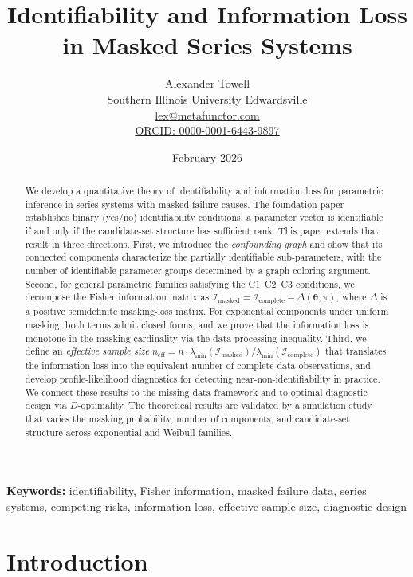 \documentclass[11pt]{article}
\title{Identifiability and Information Loss in Masked Series Systems}
\author{
    Alexander Towell\\
    Southern Illinois University Edwardsville\\
    \href{mailto:lex@metafunctor.com}{lex@metafunctor.com}\\
    \href{https://orcid.org/0000-0001-6443-9897}{ORCID: 0000-0001-6443-9897}
}
\date{February 2026}
\theoremstyle{definition}
\theoremstyle{plain}
\renewcommand{\v}[1]{\boldsymbol{#1}}
\newcommand{\btheta}{\v{\theta}}
\newcommand{\FI}{\mathcal{I}}       %
\begin{document}
\maketitle

\begin{abstract}
We develop a quantitative theory of identifiability and information loss
for parametric inference in series systems with masked failure causes.
The foundation paper \citep{towell2025masked} establishes binary
(yes/no) identifiability conditions: a parameter vector is identifiable
if and only if the candidate-set structure has sufficient rank.
This paper extends that result in three directions.
First, we introduce the \emph{confounding graph} and show that its
connected components characterize the partially identifiable
sub-parameters, with the number of identifiable parameter groups
determined by a graph coloring argument.
Second, for general parametric families satisfying the C1--C2--C3
conditions, we decompose the Fisher information matrix as
$\FI_{\mathrm{masked}} = \FI_{\mathrm{complete}} - \Delta(\btheta, \pi)$,
where $\Delta$ is a positive semidefinite masking-loss matrix.
For exponential components under uniform masking, both terms admit
closed forms, and we prove that the information loss is monotone
in the masking cardinality via the data processing inequality.
Third, we define an \emph{effective sample size}
$n_{\mathrm{eff}} = n \cdot \lambda_{\min}(\FI_{\mathrm{masked}}) / \lambda_{\min}(\FI_{\mathrm{complete}})$
that translates the information loss into the equivalent number of
complete-data observations, and develop profile-likelihood diagnostics
for detecting near-non-identifiability in practice.
We connect these results to the missing data framework
\citep{little2002} and to optimal diagnostic design via
$D$-optimality.
The theoretical results are validated by a simulation study that
varies the masking probability, number of components, and candidate-set
structure across exponential and Weibull families.
\end{abstract}

\bigskip
\noindent\textbf{Keywords:}
identifiability, Fisher information, masked failure data,
series systems, competing risks, information loss,
effective sample size, diagnostic design

\section{Introduction}
\label{sec:introduction}
\end{document}
